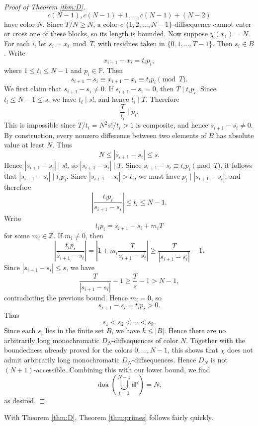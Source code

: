 \documentclass{amsart}
\theoremstyle{definition}
\begin{document}
\begin{proof}[Proof of Theorem \ref{thm:D}]
$$c(N-1),c(N-1)+1,\dots,c(N-1)+(N-2)$$ have color $N$. Since $T/N \geq N$, a color-$c$ $\{1,2,\dots,N-1\}$-diffsequence cannot enter or cross one of these blocks, so its length is bounded. Now suppose $\chi(x_1)=N$. For each $i$, let $s_i=x_i\bmod T$, with residues taken in $\{0,1,\dots,T-1\}$. Then $s_i\in B$. Write $$x_{i+1}-x_i=t_ip_i,$$ where $1\leq t_i\leq N-1$ and $p_i\in\mathbb P$. Then $$s_{i+1}-s_{i}\equiv x_{i+1}-x_i\equiv t_ip_i\pmod T.$$ We first claim that $s_{i+1}-s_{i}\neq 0$. If $s_{i+1}-s_{i}=0$, then $T\mid t_ip_i$. Since $t_i\leq N-1\leq s$, we have $t_i\mid s!$, and hence $t_i\mid T$. Therefore $$\frac{T}{t_i}\mid p_i.$$ This is impossible since $T/t_i=N^2s!/t_i>1$ is composite, and hence $s_{i+1}-s_{i}\neq 0$. By construction, every nonzero difference between two elements of $B$ has absolute value at least $N$. Thus $$N\leq |s_{i+1}-s_{i}|\leq s.$$ Hence $|s_{i+1}-s_{i}|\mid s!$, so $|s_{i+1}-s_{i}|\mid T$. Since $s_{i+1}-s_i\equiv t_ip_i\pmod T$, it follows that $|s_{i+1}-s_i|\mid t_ip_i$. Since $|s_{i+1}-s_i|>t_i$, we must have $p_i\mid |s_{i+1}-s_i|$, and therefore $$\left|\frac{t_ip_i}{s_{i+1}-s_{i}}\right|\leq t_i\leq N-1.$$ Write $$t_ip_i=s_{i+1}-s_{i}+m_iT$$ for some $m_i\in\mathbb Z$. If $m_i\neq 0$, then $$ \left|\frac{t_ip_i}{s_{i+1}-s_{i}}\right| = \left|1+m_i\frac{T}{s_{i+1}-s_{i}}\right| \geq \frac{T}{|s_{i+1}-s_{i}|}-1. $$ Since $|s_{i+1}-s_{i}|\leq s$, we have $$ \frac{T}{|s_{i+1}-s_{i}|}-1\geq \frac{T}{s}-1>N-1, $$ contradicting the previous bound. Hence $m_i=0$, so $$s_{i+1}-s_{i}=t_ip_i>0.$$ Thus $$s_1<s_2<\cdots<s_k.$$ Since each $s_i$ lies in the finite set $B$, we have $k\leq |B|$. Hence there are no arbitrarily long monochromatic $D_N$-diffsequences of color $N$. Together with the boundedness already proved for the colors $0,\dots,N-1$, this shows that $\chi$ does not admit arbitrarily long monochromatic $D_N$-diffsequences. Hence $D_N$ is not $(N+1)$-accessible. Combining this with our lower bound, we find $$\operatorname{doa}\left(\bigcup_{t=1}^{N-1}t\mathbb{P}\right)=N,$$ as desired. \end{proof}

With Theorem \ref{thm:D}, Theorem \ref{thm:primes} follows fairly quickly.
\end{document}
